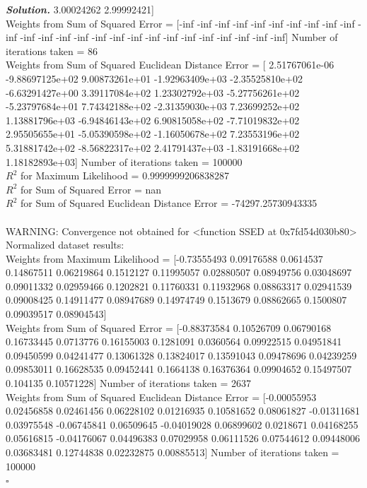\documentclass[8pt]{article}
\newenvironment{solution}[1][\it{Solution}]{\textbf{#1. } }{$\square$}
\begin{document}
\begin{solution}
 3.00024262 2.99992421] \\
Weights from Sum of Squared Error = [-inf -inf -inf -inf -inf -inf -inf -inf -inf -inf -inf -inf -inf -inf
 -inf -inf -inf -inf -inf -inf -inf -inf -inf -inf -inf -inf] Number of iterations taken =  86 \\
Weights from Sum of Squared Euclidean Distance Error = [ 2.51767061e-06 -9.88697125e+02  9.00873261e+01 -1.92963409e+03
 -2.35525810e+02 -6.63291427e+00  3.39117084e+02  1.23302792e+03
 -5.27756261e+02 -5.23797684e+01  7.74342188e+02 -2.31359030e+03
  7.23699252e+02  1.13881796e+03 -6.94846143e+02  6.90815058e+02
 -7.71019832e+02  2.95505655e+01 -5.05390598e+02 -1.16050678e+02
  7.23553196e+02  5.31881742e+02 -8.56822317e+02  2.41791437e+03
 -1.83191668e+02  1.18182893e+03] Number of iterations taken =  100000 \\
$R^2$ for Maximum Likelihood = 0.9999999206838287 \\
$R^2$ for Sum of Squared Error = nan \\
$R^2$ for Sum of Squared Euclidean Distance Error = -74297.25730943335 \\
\\
WARNING: Convergence not obtained for <function SSED at 0x7fd54d030b80>\\
Normalized dataset results:\\
Weights from Maximum Likelihood = [-0.73555493  0.09176588  0.0614537   0.14867511  0.06219864  0.1512127
  0.11995057  0.02880507  0.08949756  0.03048697  0.09011332  0.02959466
  0.1202821   0.11760331  0.11932968  0.08863317  0.02941539  0.09008425
  0.14911477  0.08947689  0.14974749  0.1513679   0.08862665  0.1500807
  0.09039517  0.08904543] \\
Weights from Sum of Squared Error = [-0.88373584  0.10526709  0.06790168  0.16733445  0.0713776   0.16155003
  0.1281091   0.0360564   0.09922515  0.04951841  0.09450599  0.04241477
  0.13061328  0.13824017  0.13591043  0.09478696  0.04239259  0.09853011
  0.16628535  0.09452441  0.1664138   0.16376364  0.09904652  0.15497507
  0.104135    0.10571228] Number of iterations taken =  2637 \\
Weights from Sum of Squared Euclidean Distance Error = [-0.00055953  0.02456858  0.02461456  0.06228102  0.01216935  0.10581652
  0.08061827 -0.01311681  0.03975548 -0.06745841  0.06509645 -0.04019028
  0.06899602  0.0218671   0.04168255  0.05616815 -0.04176067  0.04496383
  0.07029958  0.06111526  0.07544612  0.09448006  0.03683481  0.12744838
  0.02232875  0.00885513] Number of iterations taken =  100000 \\

\end{solution}
\end{document}

